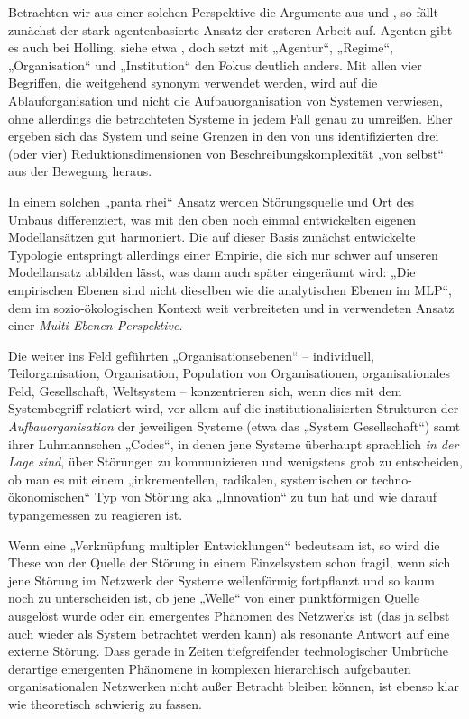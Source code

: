 \documentclass[12pt,a4paper]{article}
\begin{document}
Betrachten wir aus einer solchen Perspektive die Argumente aus
\cite{Geels2007} und \cite{Holling2001}, so fällt zunächst der stark
agentenbasierte Ansatz der ersteren Arbeit auf. Agenten gibt es auch bei
Holling, siehe etwa \cite[Tab. 2]{Holling2001}, doch setzt \cite{Geels2007}
mit „Agentur“, „Regime“, „Organisation“ und „Institution“ den Fokus deutlich
anders.  Mit allen vier Begriffen, die weitgehend synonym verwendet werden,
wird auf die Ablauforganisation und nicht die Aufbauorganisation von Systemen
verwiesen, ohne allerdings die betrachteten Systeme in jedem Fall genau zu
umreißen. Eher ergeben sich das System und seine Grenzen in den von uns
identifizierten drei (oder vier) Reduktionsdimensionen von
Beschreibungskomplexität „von selbst“ aus der Bewegung heraus.

In einem solchen „panta rhei“ Ansatz werden \cite[S. 401]{Geels2007}
Störungsquelle und Ort des Umbaus differenziert, was mit den oben noch einmal
entwickelten eigenen Modellansätzen gut harmoniert. Die auf dieser Basis
zunächst entwickelte Typologie \cite[Fig. 2]{Geels2007} entspringt allerdings
einer Empirie, die sich nur schwer auf unseren Modellansatz abbilden lässt,
was dann auch später \cite[S. 402]{Geels2007} eingeräumt wird: „Die
empirischen Ebenen sind nicht dieselben wie die analytischen Ebenen im MLP“,
dem im sozio-ökologischen Kontext weit verbreiteten und in \cite{Geels2007}
verwendeten Ansatz einer \emph{Multi-Ebenen-Perspektive}.

Die weiter ins Feld geführten „Organisationsebenen“ -- individuell,
Teilorganisation, Organisation, Population von Organisationen,
organisationales Feld, Gesellschaft, Weltsystem -- konzentrieren sich, wenn
dies mit dem Systembegriff relatiert wird, vor allem auf die
institutionalisierten Strukturen der \emph{Aufbauorganisation} der jeweiligen
Systeme (etwa das „System Gesellschaft“) samt ihrer Luhmannschen „Codes“, in
denen jene Systeme überhaupt sprachlich \emph{in der Lage sind}, über
Störungen zu kommunizieren und wenigstens grob zu entscheiden, ob man es mit
einem „inkrementellen, radikalen, systemischen or techno-ökonomischen“ Typ von
Störung aka „Innovation“ zu tun hat und wie darauf typangemessen zu reagieren
ist.

Wenn eine „Verknüpfung multipler Entwicklungen“ \cite[3.2.]{Geels2007}
bedeutsam ist, so wird die These von der Quelle der Störung in einem
Einzelsystem schon fragil, wenn sich jene Störung im Netzwerk der Systeme
wellenförmig fortpflanzt und so kaum noch zu unterscheiden ist, ob jene
„Welle“ von einer punktförmigen Quelle ausgelöst wurde oder ein emergentes
Phänomen des Netzwerks ist (das ja selbst auch wieder als System betrachtet
werden kann) als resonante Antwort auf eine externe Störung. Dass gerade in
Zeiten tiefgreifender technologischer Umbrüche derartige emergenten Phänomene
in komplexen hierarchisch aufgebauten organisationalen Netzwerken nicht außer
Betracht bleiben können, ist ebenso klar wie theoretisch schwierig zu fassen.
\end{document}
